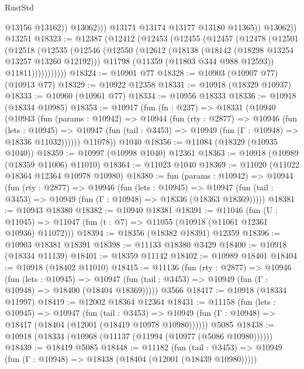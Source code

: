 \begin{lexlean}{RustStd}
\begin{coremodule}
{{{{{{{{{{{{{{{{{{{                      @13156
                      @13162))
                  @13062)))
            @13171
            @13174
            @13177
            @13180
            @11365))
        @13062))
    @13251
@18323 := @12387
    (@12412
      (@12453
        (@12455
          (@12457
            (@12478
              (@12501
                (@12518
                  (@12535
                    (@12546
                      (@12550
                        (@12612
                          (@18138 (@18142 (@18298 @13254 @13257 @13260 @12192)))
                          @11798
                          (@11359 (@11803 @344 @988 @12593))
                          @11811)))))))))))
@18324 := @10901 @77
@18328 := @10903 (@10907 @77) (@10913 @77)
@18329 := @10922 @12358
@18331 := @10918 (@18329 @10937)
@18333 := @10960 (@10961 @77)
@18334 := @10956 @18333
@18336 := @10918 (@18334 @10985)
@18353 := @10917
    (fun (fn : @237) =>
    @18331
      (@10940
        (@10943
          (fun (params : @10942) =>
          @10944
            (fun (rty : @2877) =>
            @10946
              (fun (lets : @10945) =>
              @10947 (fun (tail : @3453) => @10949 (fun (Γ : @10948) => @18336 @11032))))))
        @11078))
    @1040
@18356 := @11084 (@18329 (@10935 @1040))
@18359 := @10997 (@10998 @1040) @12361
@18363 := @10918 (@10989 (@18359 @11006) @11010)
@18364 := @11023 @1040
@18369 := @11020 (@11022 @18364 @12364 @10978 @10980)
@18380 := fun (params : @10942) =>
  @10944
    (fun (rty : @2877) =>
    @10946
      (fun (lets : @10945) =>
      @10947 (fun (tail : @3453) => @10949 (fun (Γ : @10948) => @18336 (@18363 @18369)))))
@18381 := @10943 @18380
@18382 := @10940 @18381
@18391 := @11046
    (fun (U : @11045) => @11047 (fun (t : @7) => @11055 (@10918 (@11061 @12361 @10936) @11072)))
@18394 := @18356 (@18382 @18391) @12359
@18396 := @10903 @18381 @18391
@18398 := @11133 @18380 @3429
@18400 := @10918 (@18334 @11139)
@18401 := @18359 @11142
@18402 := @10989 @18401
@18404 := @10918 (@18402 @11010)
@18415 := @11136
    (fun (rty : @2877) =>
    @10946
      (fun (lets : @10945) =>
      @10947 (fun (tail : @3453) => @10949 (fun (Γ : @10948) => @18400 (@18404 @18369)))))
    @3566
@18417 := @10918 (@18334 @11997)
@18419 := @12002 @18364 @12364
@18431 := @11158
    (fun (lets : @10945) =>
    @10947
      (fun (tail : @3453) =>
      @10949 (fun (Γ : @10948) => @18417 (@18404 (@12001 (@18419 @10978 @10980))))))
    @5085
@18438 := @10918 (@18334 (@10968 (@11137 (@11994 (@10977 (@5086 @10980))))))
@18439 := @18419 @5085
@18448 := @11182
    (fun (tail : @3453) => @10949 (fun (Γ : @10948) => @18438 (@18404 (@12001 (@18439 @10980)))))
}}}}}}}}}}}}}}}}}}}
\end{coremodule}
\end{lexlean}
